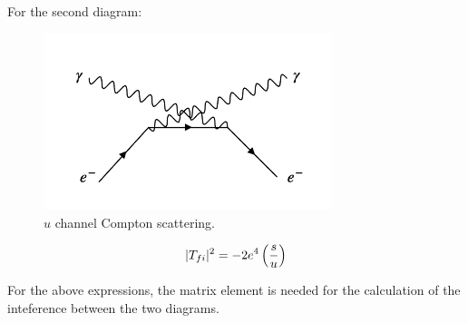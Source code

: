 For the second diagram:

\begin{figure}[!htb]
  \begin{center}
    \includegraphics[width=0.75\textwidth]{images/web_feynman/image_41.png}
    \caption[$u$ channel Compton scattering]{$u$ channel Compton scattering.}
    \label{fig:ch11_ComptonUChannel}
  \end{center}
\end{figure}

\[
  |T_{fi}|^2 = - 2e^4\left(\frac{s}{u}\right)
\]

For the above expressions, the matrix element is needed for the calculation of the inteference between the two diagrams.

